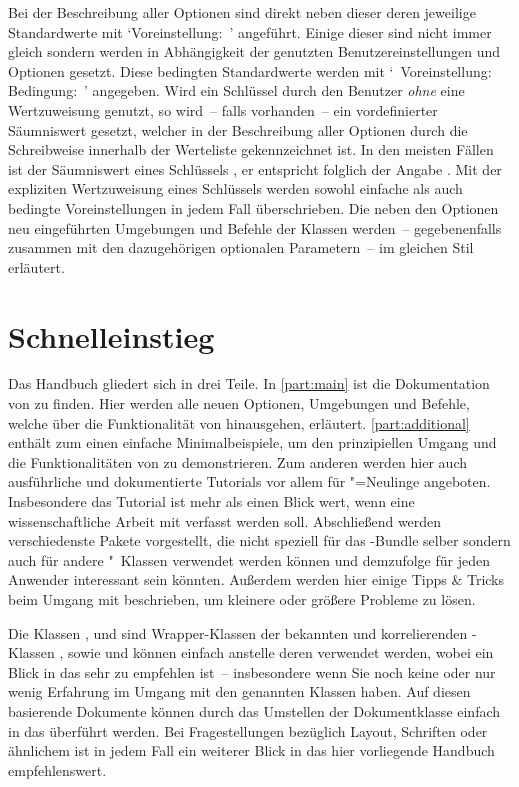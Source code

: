 Bei der Beschreibung aller Optionen sind direkt neben dieser deren jeweilige 
Standardwerte mit \mbox{\enquote*{Voreinstellung: }} angeführt. 
Einige dieser sind nicht immer gleich sondern werden in Abhängigkeit der 
genutzten Benutzereinstellungen und Optionen gesetzt. Diese bedingten 
Standardwerte werden mit 
\mbox{\enquote*{%
  Voreinstellung: \,\textbar\,Bedingung: %
}}
angegeben. Wird ein Schlüssel durch den Benutzer \emph{ohne} eine Wertzuweisung 
genutzt, so wird~-- falls vorhanden~-- ein vordefinierter Säumniswert gesetzt, 
welcher in der Beschreibung aller Optionen durch die~ 
Schreibweise innerhalb der Werteliste gekennzeichnet ist. In den meisten Fällen 
ist der Säumniswert eines Schlüssels , er entspricht folglich der 
Angabe . Mit der expliziten Wertzuweisung eines 
Schlüssels werden sowohl einfache als auch bedingte Voreinstellungen in jedem 
Fall überschrieben. Die neben den Optionen neu eingeführten Umgebungen und 
Befehle der Klassen werden~-- gegebenenfalls zusammen mit den dazugehörigen 
optionalen Parametern~-- im gleichen Stil erläutert.



\section{Schnelleinstieg}
%
Das Handbuch gliedert sich in drei Teile. In \autoref{part:main} ist die 
Dokumentation von \TUDScript zu finden. Hier werden alle neuen Optionen, 
Umgebungen und Befehle, welche über die Funktionalität von \KOMAScript 
hinausgehen, erläutert. \autoref{part:additional} enthält zum einen einfache 
Minimalbeispiele, um den prinzipiellen Umgang und die Funktionalitäten von 
\TUDScript zu demonstrieren. Zum anderen werden hier auch ausführliche und 
dokumentierte Tutorials vor allem für "=Neulinge angeboten. 
Insbesondere das Tutorial  ist mehr als einen Blick wert, 
wenn eine wissenschaftliche Arbeit mit  verfasst werden soll.
Abschließend werden verschiedenste Pakete vorgestellt, die nicht speziell für 
das \TUDScript-Bundle selber sondern auch für andere "~Klassen
verwendet werden können und demzufolge für jeden Anwender interessant sein 
könnten. Außerdem werden hier einige Tipps \& Tricks beim Umgang mit 
 beschrieben, um kleinere oder größere Probleme zu lösen.

Die Klassen ,  und  
sind Wrapper-Klassen der bekannten und korrelierenden \KOMAScript-Klassen 
,  sowie  und können einfach 
anstelle deren verwendet werden, wobei ein Blick in das \scrguide sehr zu 
empfehlen ist~-- insbesondere wenn Sie noch keine oder nur wenig Erfahrung im 
Umgang mit den genannten Klassen haben. Auf diesen basierende Dokumente können 
durch das Umstellen der Dokumentklasse einfach in das \TUDCD überführt werden. 
Bei Fragestellungen bezüglich Layout, Schriften oder ähnlichem ist in jedem 
Fall ein weiterer Blick in das hier vorliegende Handbuch empfehlenswert.



